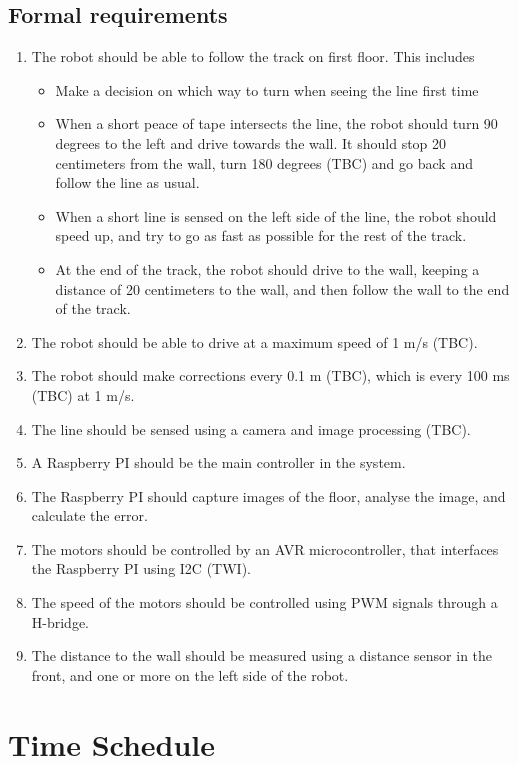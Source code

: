 \subsection{Formal requirements}
\begin{enumerate}
\item The robot should be able to follow the track on first floor. This includes 
\begin{itemize}
\item Make a decision on which way to turn when seeing the line first time
\item When a short peace of tape intersects the line, the robot should turn 90 degrees to the left
and drive towards the wall. It should stop 20 centimeters from the wall, turn 180 degrees
(TBC) and go back and follow the line as usual.
\item When a short line is sensed on the left side of the line, the robot should speed up, and try to go as fast as possible for the rest of the track.
\item At the end of the track, the robot should drive to the wall, keeping a distance of 20
centimeters to the wall, and then follow the wall to the end of the track.
\end{itemize}
\item The robot should be able to drive at a maximum speed of 1 m/s (TBC).
\item The robot should make corrections every 0.1 m (TBC), which is every 100 ms (TBC) at 1 m/s.
\item The line should be sensed using a camera and image processing (TBC).
\item A Raspberry PI should be the main controller in the system.
\item The Raspberry PI should capture images of the floor, analyse the image, and calculate the error.
\item The motors should be controlled by an AVR microcontroller, that interfaces the Raspberry PI
using I2C (TWI).
\item The speed of the motors should be controlled using PWM signals through a H-bridge.
\item The distance to the wall should be measured using a distance sensor in the front, and one or more on the
left side of the robot.
\end{enumerate}



\section{Time Schedule}

